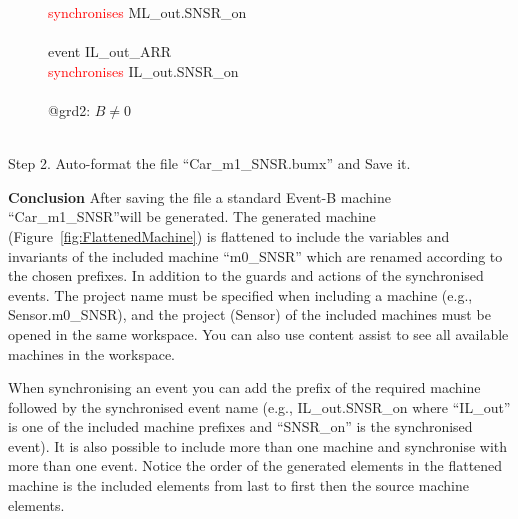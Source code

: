 \begin{description}
\begin{center}
\begin{Bcode}
			\Btab \textcolor{red}{synchronises} ML_out.SNSR_on\\
			\Btab \Bend\\
			\Btab event IL_out_ARR\\
			\Btab \textcolor{red}{synchronises} IL_out.SNSR_on\\
			\Btab \Bwhere\\
			\Btab \Btab @grd2: \(B \neq 0\)\\
			\Btab \Bend\\
			\Bend
			\fi
		\end{Bcode}
	\end{center}
	\item[Step 2. Auto-format the file ``Car\_m1\_SNSR.bumx'' and Save it.]
\end{description}
\textbf{Conclusion} After saving the file a standard Event-B machine ``Car\_m1\_SNSR''will be generated. The generated machine (Figure~\ref{fig:FlattenedMachine}) is flattened to include the variables and invariants  of the included machine ``m0\_SNSR'' which are renamed according to the chosen prefixes. In addition to the guards and actions of the synchronised events. The project name must be specified when including a machine (e.g., Sensor.m0\_SNSR), and the project (Sensor) of the included machines must be opened in the same workspace. You can also use content assist to see all available machines in the workspace.

When synchronising an event you can add the prefix of the required machine followed by the synchronised event name (e.g., IL\_out.SNSR\_on where ``IL\_out'' is one of the included machine prefixes and ``SNSR\_on'' is the synchronised event). It is also possible to include more than one machine and synchronise with more than one event. Notice the order of the generated elements in the flattened machine is the included elements from last to first then the source machine elements.

